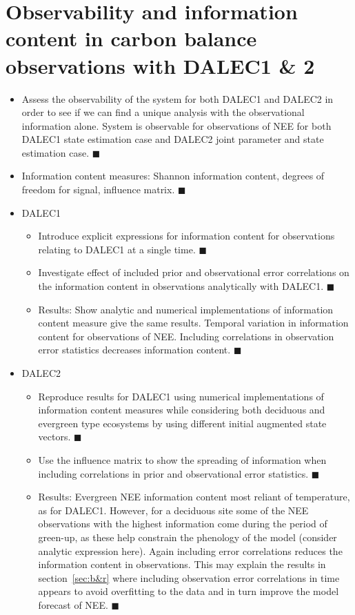 \documentclass[11pt]{article}
\begin{document}
\section{Observability and information content in carbon balance observations with DALEC1 \& 2} \label{sec:ic}
\begin{itemize}
\item Assess the observability of the system for both DALEC1 and DALEC2 in order to see if we can find a unique analysis with the observational information alone. System is observable for observations of NEE for both DALEC1 state estimation case and DALEC2 joint parameter and state estimation case. {\color{green} $\blacksquare$}
\item Information content measures: Shannon information content, degrees of freedom for signal, influence matrix. {\color{green} $\blacksquare$}
\item DALEC1
\begin{itemize}
\item Introduce explicit expressions for information content for observations relating to DALEC1 at a single time. {\color{green} $\blacksquare$}
\item Investigate effect of included prior and observational error correlations on the information content in observations analytically with DALEC1. {\color{green} $\blacksquare$}
\item Results: Show analytic and numerical implementations of information content measure give the same results. Temporal variation in information content for observations of NEE. Including correlations in observation error statistics decreases information content. {\color{green} $\blacksquare$}
\end{itemize}
\item DALEC2
\begin{itemize}
\item Reproduce results for DALEC1 using numerical implementations of information content measures while considering both deciduous and evergreen type ecosystems by using different initial augmented state vectors. {\color{yellow} $\blacksquare$}
\item Use the influence matrix to show the spreading of information when including correlations in prior and observational error statistics. {\color{yellow} $\blacksquare$}
\item Results: Evergreen NEE information content most reliant of temperature, as for DALEC1. However, for a deciduous site some of the NEE observations with the highest information come during the period of green-up, as these help constrain the phenology of the model (consider analytic expression here). Again including error correlations reduces the information content in observations. This may explain the results in section~\ref{sec:b&r} where including observation error correlations in time appears to avoid overfitting to the data and in turn improve the model forecast of NEE. {\color{yellow} $\blacksquare$}

\end{itemize}
\end{itemize}
\end{document}
